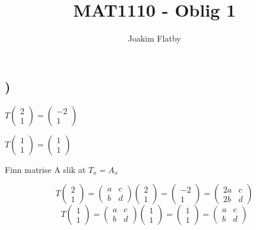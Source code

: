 \documentclass[a4paper,10pt,norsk]{article}
\title{MAT1110 - Oblig 1}
\author{Joakim Flatby}
\begin{document}
\maketitle
\section{}

\subsection{)}

$T\left(\begin{matrix}2\\1\end{matrix}\right) = \left(\begin{matrix}-2\\1\end{matrix}\right)$

$T\left(\begin{matrix}1\\1\end{matrix}\right) = \left(\begin{matrix}1\\1\end{matrix}\right)$

Finn matrise A slik at $T_{x} = A_{x}$

\[T\left(\begin{matrix}2\\1\end{matrix}\right) = \left(\begin{matrix}a&c\\b&d\end{matrix}\right)\left(\begin{matrix}2\\1\end{matrix}\right) = \left(\begin{matrix}-2\\1\end{matrix}\right) = \left(\begin{matrix}2a&c\\2b&d\end{matrix}\right)\]
\[T\left(\begin{matrix}1\\1\end{matrix}\right) = \left(\begin{matrix}a&c\\b&d\end{matrix}\right)\left(\begin{matrix}1\\1\end{matrix}\right) = \left(\begin{matrix}1\\1\end{matrix}\right) = \left(\begin{matrix}a&c\\b&d\end{matrix}\right)\]
\end{document}
